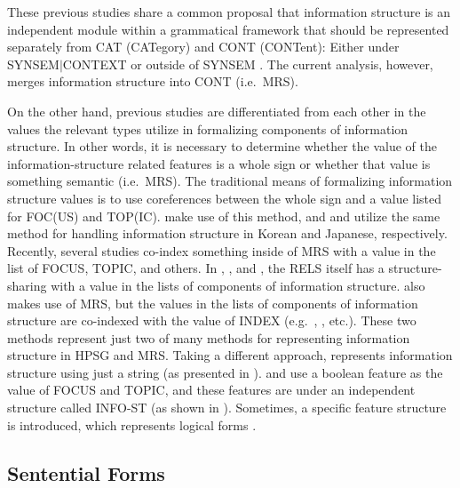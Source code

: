These previous studies share a common proposal that information
structure is an independent module within a grammatical framework that
should be represented separately from CAT (CATegory) and CONT
(CONTent): Either under SYNSEM{$\mid$}CONTEXT
\citep{engdahl:vallduvi:96,chang:02,ohtani:matsumoto:04,yoshimoto:etal:06,paggio:09}
or outside of SYNSEM \citep{dekuthy:00,chung:etal:03,bildhauer:07}.
The current analysis, however, merges information structure into CONT
(i.e.\ MRS).



On the other hand, previous studies are differentiated from each other
in the values the relevant types utilize in formalizing components of
information structure. In other words, it is necessary to determine
whether the value of the information-structure related features is a
whole sign or whether that value is something semantic
(i.e.\ MRS). The traditional means of formalizing information
structure values is to use coreferences between the whole sign and a
value listed for FOC(US) and TOP(IC). \citet{engdahl:vallduvi:96} make
use of this method, and \citet{chung:etal:03} and
\citet{ohtani:matsumoto:04} utilize the same method for handling
information structure in Korean and Japanese, respectively. Recently,
several studies co-index something inside of MRS with a value in the
list of FOCUS, TOPIC, and others. In \citet{yoshimoto:etal:06},
\citet{bildhauer:07}, and \citet{sato:tam:12}, the RELS itself has a
structure-sharing with a value in the lists of components of
information structure.  \citet{paggio:09} also makes use of
MRS, but the values in the lists of components of information
structure are co-indexed with the value of INDEX (e.g.\ ,
, etc.).  These two methods represent just two of many methods
for representing information structure in HPSG and
MRS. Taking a different approach, \citet{chang:02}
represents information structure using just a string (as presented in
 ). \citet{kim:07} and
\citet{kim:12a} use a boolean feature as the value of FOCUS and TOPIC,
and these features are under an independent structure called INFO-ST
(as shown in  ).  Sometimes,
a specific feature structure is introduced, which represents logical
forms \citep{webelhuth:07,dekuthy:meurers:11}.


\subsection{Sentential Forms}
\label{8:ssec:sform}


